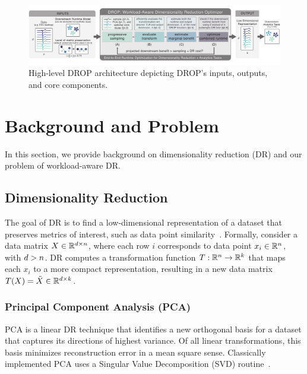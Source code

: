 \begin{figure}
\begin{center}
\includegraphics[width=\textwidth]{figs/system_arch.pdf}\vspace{-1em}
\caption[]{High-level DROP architecture depicting DROP's inputs, outputs, and core components.}
\end{center}
\vspace{-1em}
\label{fig:arch}
\end{figure}

\section{Background and Problem}
\label{sec:background}

In this section, we provide background on dimensionality reduction (DR) and our problem of workload-aware DR.

\subsection{Dimensionality Reduction}
\label{sec:defs}

The goal of DR is to find a low-dimensional representation of a dataset that preserves metrics of interest, such as data point similarity~\cite{dr-survey1,dr-survey2}. Formally, consider a data matrix $X \in \mathbb{R}^{{\color{black}d} \times {\color{black}n}}$, where each row $i$ corresponds to data point $x_i \in \mathbb{R}^{\color{black}n}$, with ${\color{black}d} > {\color{black}n}$.  
DR computes a transformation function $T: \mathbb{R}^{\color{black}n} \rightarrow \mathbb{R}^k$ that maps each $x_i$ to a more compact representation, resulting in a new data matrix $T(X) = \tilde{X} \in \mathbb{R}^{{\color{black}d} \times k}$.

\subsubsection*{Principal Component Analysis (PCA)}
\label{sec:pca}
PCA is a linear DR technique that identifies a new orthogonal basis for a dataset that captures its directions of highest variance.
Of all linear transformations, this basis minimizes reconstruction error in a mean square sense. 
Classically implemented PCA uses a Singular Value Decomposition (SVD) routine~\cite{trefethen}.


